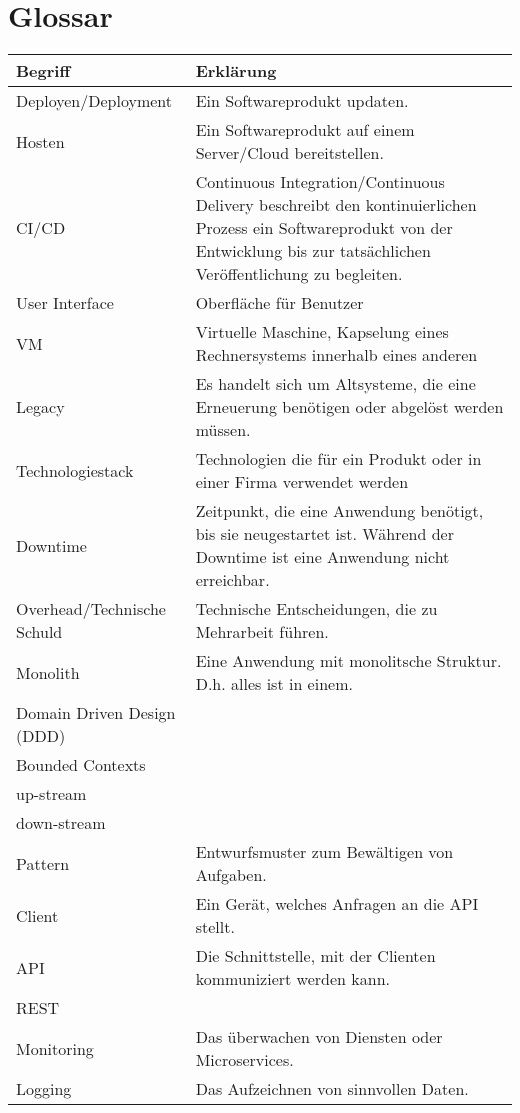 \section{Glossar}
\begin{longtable}[center]{lp{10cm}}
				Begriff & Erklärung \\ \hline
				Deployen/Deployment & Ein Softwareprodukt updaten.  \\
				Hosten & Ein Softwareprodukt auf einem Server/Cloud bereitstellen. \\
				CI/CD & Continuous Integration/Continuous Delivery beschreibt den kontinuierlichen Prozess ein Softwareprodukt von der Entwicklung bis zur tatsächlichen Veröffentlichung zu begleiten.\\
				User Interface  & Oberfläche für Benutzer  \\
				VM & Virtuelle Maschine, Kapselung eines Rechnersystems innerhalb eines anderen  \\
				Legacy & Es handelt sich um Altsysteme, die eine Erneuerung benötigen oder abgelöst werden müssen. \\
				Technologiestack & Technologien die für ein Produkt oder in einer Firma verwendet werden  \\
				Downtime & Zeitpunkt, die eine Anwendung benötigt, bis sie neugestartet ist. Während der Downtime ist eine Anwendung nicht erreichbar.  \\
				Overhead/Technische Schuld & Technische Entscheidungen, die zu Mehrarbeit führen. \\
				Monolith & Eine Anwendung mit monolitsche Struktur. D.h. alles ist in einem. \\ 
				Domain Driven Design (DDD) &  \\	
				Bounded Contexts & \\
				up-stream & \\
				down-stream & \\
				Pattern & Entwurfsmuster zum Bewältigen von Aufgaben.\\
				Client & Ein Gerät, welches Anfragen an die API stellt. \\
				API & Die Schnittstelle, mit der Clienten kommuniziert werden kann.\\
				REST & \\
				Monitoring & Das überwachen von Diensten oder Microservices.\\
				Logging & Das Aufzeichnen von sinnvollen Daten.\\

\end{longtable}
